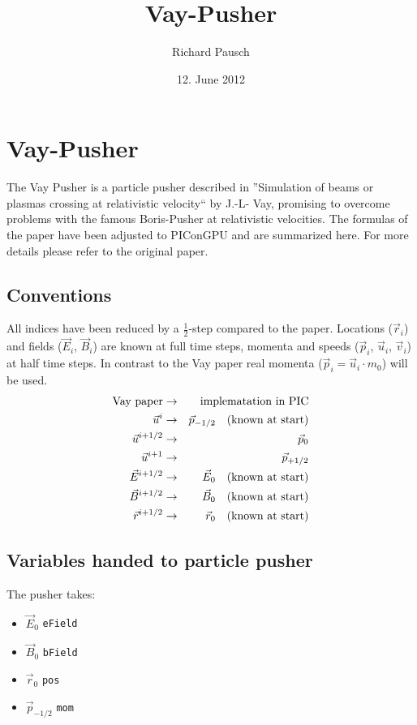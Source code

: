 \documentclass[a4paper,12pt]{article}
\title{Vay-Pusher}
\author{Richard Pausch}
\date{12. June 2012}
\begin{document}
\section{Vay-Pusher}

The Vay Pusher is a particle pusher described in ''Simulation of beams or plasmas crossing at relativistic velocity`` by J.-L- Vay, promising to overcome problems with the famous Boris-Pusher at relativistic velocities. The formulas of the paper have been adjusted to PIConGPU and are summarized here. For more details please refer to the original paper.


\subsection{Conventions}
All indices have been reduced by a $\frac{1}{2}$-step compared to the paper.
Locations ($\vec r_i$) and fields ($\vec E_i$, $\vec B_i$) are known at full time steps, momenta and speeds ($\vec p_i$, $\vec u_i$, $\vec v_i$) at half time steps. In contrast to the Vay paper real momenta ($\vec p_i = \vec u_i \cdot m_0$) will be used.
\begin{eqnarray*}
\mbox{Vay paper} & \rightarrow & \mbox{implematation in PIC} \\
\vec u^{i} & \rightarrow & \vec p_{-1/2} \mbox{\quad  (known at start)}\\
\vec u^{i+1/2} & \rightarrow & \vec p_{0}\\
\vec u^{i+1} & \rightarrow & \vec p_{+1/2}\\
\vec E^{i+1/2} & \rightarrow & \vec E_{0}  \mbox{\quad  (known at start)}\\
\vec B^{i+1/2} & \rightarrow & \vec B_{0}  \mbox{\quad  (known at start)}\\
\vec r^{i+1/2} & \rightarrow & \vec r_{0}  \mbox{\quad  (known at start)}
\end{eqnarray*}

\subsection{Variables handed to particle pusher}
The pusher takes:
\begin{itemize}
	\item $\vec E_0$ \quad \texttt{eField}
	\item $\vec B_0$ \quad \texttt{bField}
	\item $\vec r_0$ \qquad \texttt{pos}
	\item $\vec p_{-1/2}$ \quad \texttt{mom}
\end{itemize}
\end{document}
